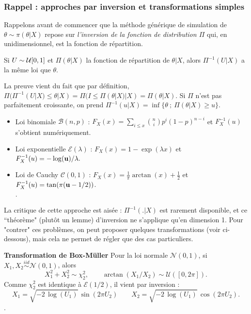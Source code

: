 \subsubsection{Rappel : approches par inversion et transformations simples}

Rappelons avant de commencer que la méthode générique de simulation de $\theta\sim \pi(\theta|X)$ repose sur \emph{l'inversion de la fonction de distribution $\Pi$} qui, en unidimensionnel, est la fonction de répartition. \\

\begin{theorem}
Si $U\sim{\cal{U}}[0,1]$ et $\Pi(\theta|X)$ la fonction de répartition de $\theta|X$, alors $\Pi^{-1}(U|X)$ a la même loi que $\theta$.
\end{theorem}

La preuve vient du fait que par définition, $\Pi(\Pi^{-1}(U|X)\leq \theta|X)=\Pi(I\leq \Pi(\theta|X)|X)=\Pi(\theta|X)$. Si $\Pi$ n'est pas parfaitement croissante, on prend $\Pi^{-1}(u|X)=\inf\{\theta \ ; \ \Pi(\theta|X)\geq u\}$. \\



\begin{exo}
\begin{itemize} 
\item Loi binomiale ${\mathcal B}(n,p)$ : 
$
  F_X(x) = \sum_{i\le x} {n\choose i} p^i (1-p)^{n-i}
$
et $F_X^{-1}(u)$ s'obtient num\'eriquement.
\item  Loi exponentielle ${\mathcal E} (\lambda)$ :  
$
F_X(x) = 1 - \exp(\lambda x)$ et $
F_X^{-1}(u) = -\log({\textcolor{black}{\mathbf{u}}})/\lambda.
$
\item Loi de Cauchy ${\mathcal C} (0,1)$ : 
$
F_X(x) = \frac{1}{\pi} \arctan (x) + \frac{1}{2}$ et 
$ F_X^{-1}(u) = \tan(\pi({\textcolor{black}{\mathbf{u}}}-1/2))$. \\
.
\end{itemize}
\end{exo}

La critique de cette approche est aisée : $\Pi^{-1}(.|X)$ est rarement disponible, et ce ``théorème" (plutôt un lemme) d'inversion ne s'applique qu'en dimension 1. Pour "contrer" ces problèmes, on peut proposer quelques transformations (voir ci-dessous), mais cela ne permet de régler que des cas particuliers. \\

\begin{definition}{\bf Transformation de Box-M\"uller}
Pour la loi normale ${\mathcal N}(0,1)$, si $X_1,X_2\overset{iid}{\sim}{\mathcal N}(0,1)$, alors
$$
  X_1^2+X_2^2 \sim \chi^2_2, \qquad \arctan(X_1/X_2) \sim \mathcal{U}([0,2\pi]).
$$
Comme $\chi^2_2$ est identique \`a ${\mathcal E} (1/2)$, il vient par inversion :
$$
  X_1 = \sqrt{-2\,\log(U_1)} \,\sin (2\pi U_2)\qquad X_2 = \sqrt{-2\,\log(U_1)} \,\cos(2\pi U_2).
$$. 
\end{definition}

